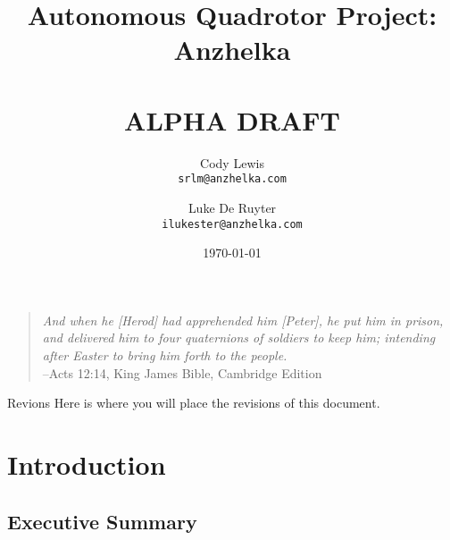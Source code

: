 \documentclass{article}
\numberwithin{equation}{section} %
\begin{document}
\title{Autonomous Quadrotor Project: \\ Anzhelka \\ \- \\ {\bf ALPHA DRAFT}}
\author{Cody Lewis \\ \texttt{srlm@anzhelka.com} \and Luke De Ruyter \\ \texttt{ilukester@anzhelka.com} }
\date{\today}
\maketitle
\begin{verse}\textit{
And when he [Herod] had apprehended him [Peter], he put him in prison, and delivered him to four quaternions of soldiers to keep him; intending after Easter to bring him forth to the people.} \\
\hfill --Acts 12:14, King James Bible, Cambridge Edition
\end{verse}

\newpage
{}
\begin{paragraph}{Revions}
{
Here is where you will place the revisions of this document.
}
\end{paragraph}

\newpage
\renewcommand{\contentsname}{Table of Contents}
\tableofcontents
{}
\newpage



\section{Introduction}

\subsection{Executive Summary}
\end{document}
